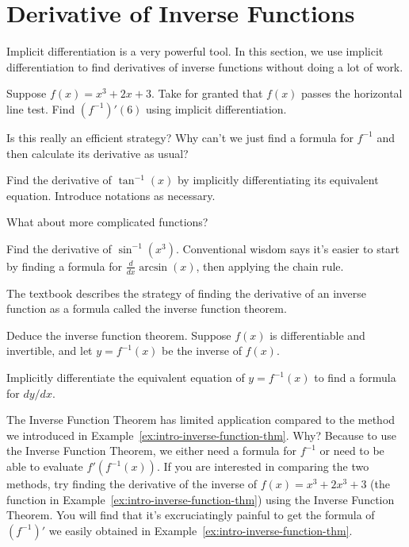 \documentclass[../main.tex]{subfiles}
\begin{document}
 \section{Derivative of Inverse Functions}
  Implicit differentiation is a very powerful tool. In this section, we use implicit differentiation to find derivatives of inverse functions without doing a lot of work. 

  \begin{example} \label{ex:intro-inverse-function-thm}
    Suppose \(f(x) = x^{3} + 2x + 3\). Take for granted that \(f(x)\) passes the horizontal line test. Find \((f^{-1})'(6)\) using implicit differentiation.
  \end{example}
  \faComment{} Is this really an efficient strategy? Why can't we just find a formula for \(f^{-1}\) and then calculate its derivative as usual?
  \clearpage

  \begin{example} \label{ex:derivative-of-arctan}
    Find the derivative of \(\tan^{-1}(x)\) by implicitly differentiating its equivalent equation.  
    Introduce notations as necessary.

  \end{example}
  
  What about more complicated functions? 
  \begin{example} \label{ex:derivative-of-arcsin}
    Find the derivative of \(\sin^{-1}(x^{3})\).  Conventional wisdom says it's easier to start by finding a formula for \(\frac{d}{dx} \arcsin(x)\), then applying the chain rule.

  \end{example}
  \clearpage

  The textbook describes the strategy of finding the derivative of an inverse function as a formula called the inverse function theorem. 
  \begin{example}
    Deduce the inverse function theorem.  Suppose \(f(x)\) is differentiable and invertible, and let \(y = f^{-1}(x)\) be the inverse of \(f(x)\).

    Implicitly differentiate the equivalent equation of \(y = f^{-1}(x)\) to find a formula for \(dy/dx\).

  \end{example}

  \faExclamationTriangle{} The Inverse Function Theorem has limited application compared to the method we introduced in Example~\ref{ex:intro-inverse-function-thm}. Why? Because to use the Inverse Function Theorem, we either need a formula for \(f^{-1}\) or need to be able to evaluate \(f'(f^{-1}(x))\). If you are interested in comparing the two methods, try finding the derivative of the inverse of \(f(x) = x^{3} + 2x^{3} + 3\) (the function in Example~\ref{ex:intro-inverse-function-thm}) using the Inverse Function Theorem. You will find that it's excruciatingly painful to get the formula of \((f^{-1})'\) we easily obtained in Example~\ref{ex:intro-inverse-function-thm}.

  
\end{document}
